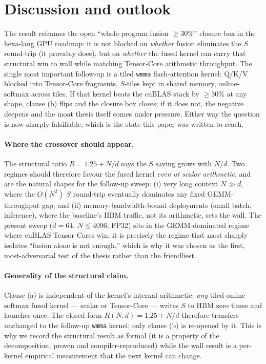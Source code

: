 \documentclass[11pt,a4paper]{article}
\newcommand{\verdict}[1]{\texttt{#1}}
\begin{document}
\section{Discussion and outlook}
\label{sec:discussion}

The result reframes the open ``whole-program fusion $\geq 30\%$'' closure box in
the hexa-lang GPU roadmap: it is not blocked on \emph{whether} fusion eliminates
the $S$ round-trip (it provably does), but on \emph{whether} the fused kernel
can carry that structural win to wall while matching Tensor-Core arithmetic
throughput. The single most important follow-up is a tiled \verdict{wmma}
flash-attention kernel: Q/K/V blocked into Tensor-Core fragments, $S$-tiles kept
in shared memory, online-softmax across tiles. If that kernel beats the cuBLAS
stack by $\geq 30\%$ at any shape, clause (b) flips and the closure box closes;
if it does not, the negative deepens and the moat thesis itself comes under
pressure. Either way the question is now sharply falsifiable, which is the state
this paper was written to reach.

\paragraph{Where the crossover should appear.}
The structural ratio $R=1.25+N/d$ says the $S$ saving grows with $N/d$. Two
regimes should therefore favour the fused kernel \emph{even at scalar
arithmetic}, and are the natural shapes for the follow-up sweep: (i) very long
context $N\gg d$, where the $O(N^2)$ $S$ round-trip eventually dominates any
fixed GEMM-throughput gap; and (ii) memory-bandwidth-bound deployments (small
batch, inference), where the baseline's HBM traffic, not its arithmetic, sets
the wall. The present sweep ($d{=}64$, $N\le 4096$, FP32) sits in the
GEMM-dominated regime where cuBLAS Tensor Cores win; it is precisely the regime
that most sharply isolates ``fusion alone is not enough,'' which is why it was
chosen as the first, most-adversarial test of the thesis rather than the
friendliest.

\paragraph{Generality of the structural claim.}
Clause (a) is independent of the kernel's internal arithmetic: \emph{any} tiled
online-softmax fused kernel --- scalar or Tensor-Core --- writes $S$ to HBM zero
times and launches once. The closed form $R(N,d)=1.25+N/d$ therefore transfers
unchanged to the follow-up \verdict{wmma} kernel; only clause (b) is re-opened
by it. This is why we record the structural result as formal (it is a property
of the decomposition, proven and compiler-reproduced) while the wall result is a
per-kernel empirical measurement that the next kernel can change.
\end{document}
